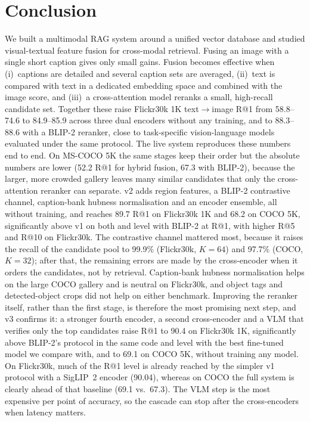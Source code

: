\documentclass[conference]{IEEEtran}
\newcommand{\RA}{\ensuremath{\rightarrow}}
\begin{document}
\section{Conclusion}
We built a multimodal RAG system around a unified vector database and studied visual-textual feature fusion
for cross-modal retrieval. Fusing an image with a single short caption gives only small gains. Fusion
becomes effective when (i)~captions are detailed and several caption sets are averaged, (ii)~text is compared
with text in a dedicated embedding space and combined with the image score, and (iii)~a cross-attention model
reranks a small, high-recall candidate set. Together these raise Flickr30k 1K text\RA image R@1 from
58.8--74.6 to 84.9--85.9 across three dual encoders without any training, and to 88.3--88.6 with a BLIP-2
reranker, close to task-specific vision-language models evaluated under the same protocol. The live system
reproduces these numbers end to end. On MS-COCO 5K the same stages keep their order but the absolute numbers
are lower (52.2 R@1 for hybrid fusion, 67.3 with BLIP-2), because the larger, more crowded gallery leaves many
similar candidates that only the cross-attention reranker can separate.
v2 adds region features, a BLIP-2 contrastive channel, caption-bank hubness normalisation and an encoder ensemble,
all without training, and reaches 89.7 R@1 on Flickr30k 1K and 68.2 on COCO 5K, significantly above v1 on both and
level with BLIP-2 at R@1, with higher R@5 and R@10 on Flickr30k. The contrastive channel mattered most, because it
raises the recall of the candidate pool to 99.9\% (Flickr30k, $K=64$) and 97.7\% (COCO, $K=32$); after that, the
remaining errors are made by the cross-encoder when it orders the candidates, not by retrieval. Caption-bank
hubness normalisation helps on the large COCO gallery and is neutral on Flickr30k, and object tags and detected-object
crops did not help on either benchmark. Improving the reranker itself, rather than the first stage, is therefore
the most promising next step, and v3 confirms it: a stronger fourth encoder, a second cross-encoder and a VLM that
verifies only the top candidates raise R@1 to 90.4 on Flickr30k 1K, significantly above BLIP-2's protocol in the
same code and level with the best fine-tuned model we compare with, and to 69.1 on COCO 5K, without training any
model. On Flickr30k, much of the R@1 level is already reached by the simpler v1 protocol with a SigLIP~2 encoder
(90.04), whereas on COCO the full system is clearly ahead of that baseline (69.1 vs.\ 67.3). The VLM step is the
most expensive per point of accuracy, so the cascade can stop after the cross-encoders when latency matters.
\end{document}
